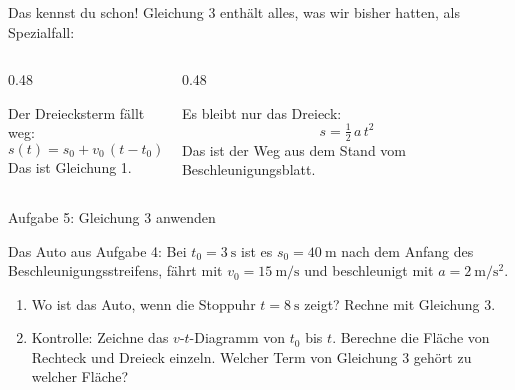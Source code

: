 \documentclass[14pt,aspectratio=169]{beamer}
\begin{document}
\begin{frame}{Das kennst du schon!}
  \small
  Gleichung 3 enthält alles, was wir bisher hatten, als Spezialfall:
  \vspace{0.3em}
  \begin{columns}[T]
    \begin{column}{0.48\textwidth}
      \begin{merkbox}[Keine Beschleunigung: $a=0$]
        Der Dreiecksterm fällt weg:
        \[
          s(t)=s_0+v_0\,(t-t_0)
        \]
        Das ist Gleichung 1.
      \end{merkbox}
    \end{column}
    \begin{column}{0.48\textwidth}
      \begin{merkbox}[Aus dem Stand: $s_0=0$, $v_0=0$, $t_0=0$]
        Es bleibt nur das Dreieck:
        \[
          s=\tfrac12\,a\,t^2
        \]
        Das ist der \glqq Weg aus dem Stand\grqq{} vom
        Beschleunigungsblatt.
      \end{merkbox}
    \end{column}
  \end{columns}
\end{frame}

\begin{frame}{Aufgabe 5: Gleichung 3 anwenden}
  \begin{aufgabebox}[Aufgabe 5]
    \small
    Das Auto aus Aufgabe 4: Bei $t_0=\SI{3}{\second}$ ist es
    $s_0=\SI{40}{\meter}$ nach dem Anfang des Beschleunigungsstreifens,
    fährt mit $v_0=\SI{15}{\meter\per\second}$ und beschleunigt mit
    $a=\SI{2}{\meter\per\second\squared}$.
    \begin{enumerate}
      \item[a)] Wo ist das Auto, wenn die Stoppuhr $t=\SI{8}{\second}$
        zeigt? Rechne mit Gleichung 3.
      \item[b)] Kontrolle: Zeichne das $v$-$t$-Diagramm von $t_0$ bis $t$.
        Berechne die Fläche von Rechteck und Dreieck einzeln. Welcher Term
        von Gleichung 3 gehört zu welcher Fläche?
    \end{enumerate}
  \end{aufgabebox}
\end{frame}
\end{document}
